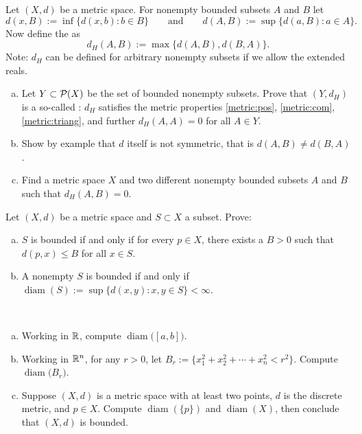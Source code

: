 
\begin{exercise} \label{exercise:mshausdorffpseudo}
Let $(X,d)$ be a metric space.  For nonempty bounded subsets $A$ and $B$ let
\begin{equation*}
d(x,B) := \inf \{ d(x,b) : b \in B \}
\qquad \text{and} \qquad
d(A,B) := \sup \{ d(a,B) : a \in A \} .
\end{equation*}
Now define the \emph{} as
\begin{equation*}
d_H(A,B) := \max \{ d(A,B) , d(B,A) \} .
\end{equation*}
Note: $d_H$ can be defined for arbitrary nonempty subsets if we allow the
extended reals.
\begin{enumerate}[a)]
\item
Let $Y \subset {\mathcal{P}}(X)$ be the set of bounded nonempty subsets.
Prove that
$(Y,d_H)$ is a so-called \emph{}:
$d_H$ satisfies the metric properties
\ref{metric:pos},
\ref{metric:com}, 
\ref{metric:triang}, and further
$d_H(A,A) = 0$ for all $A \in Y$. 
\item
Show by example that $d$ itself is not symmetric, that is $d(A,B) \not=
d(B,A)$.
\item
Find a metric space $X$ and two different
nonempty bounded subsets $A$ and $B$ such that $d_H(A,B) = 0$.
\end{enumerate}
\end{exercise}

\begin{exercise}
Let $(X,d)$ be a metric space and $S \subset X$ a subset.  Prove:
\begin{enumerate}[a)]
\item
$S$ is bounded if and only if
for every $p \in X$, there exists a $B > 0$ such that $d(p,x) \leq B$ for
all $x \in S$.
\item
A nonempty $S$ is bounded if and only if
$\operatorname{diam}(S) := \sup \{ d(x,y) : x,y \in S \} < \infty$.
\end{enumerate}
\end{exercise}

\begin{exercise}
{\ }
\begin{enumerate}[a)]
\item
Working in ${\mathbb{R}}$, compute $\operatorname{diam}\bigl([a,b]\bigr)$.
\item
Working in ${\mathbb{R}}^n$, for any $r > 0$, let $B_r := \{ x_1^2+x_2^2+\cdots+x_n^2
< r^2 \}$.  Compute $\operatorname{diam}\bigl(B_r\bigr)$.
\item
Suppose $(X,d)$ is a metric space with at least two points,
$d$ is the discrete metric, and $p \in X$.
Compute
$\operatorname{diam}(\{ p \})$ and $\operatorname{diam}(X)$,
then conclude that $(X,d)$ is bounded.
\end{enumerate}
\end{exercise}

